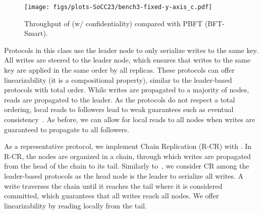 \begin{figure}[t]
\centering

    \texttt{[image: figs/plots-SoCC23/bench3-fixed-y-axis\_c.pdf]}
       
       \caption{Throughput of \projecttitle{} (w/ confidentiality) compared with PBFT (BFT-Smart).}
    \label{fig:confidentiality}
\end{figure}
Protocols in this class use the leader node to only serialize
writes to the same key. All writes are steered to
the leader node, which ensures that writes to the
same key are applied in the same order by all replicas. %
These protocols can offer linearizability (it is a compositional property), similar to the leader-based protocols with total order. While writes are propagated to a majority of nodes, reads are propagated to the leader. As the protocols do not respect a total ordering, local reads to followers lead to weak guarantees such as eventual consistency~\cite{10.1145/1435417.1435432}. As before, we can allow for local reads to all nodes when writes are guaranteed to propagate to all followers. 

 As a representative protocol, we implement Chain Replication (R-CR) with \projecttitle{}. In R-CR, the nodes are organized in a chain, through which writes are propagated from the head of the chain to its tail. Similarly to~\cite{f04eb9b864204bab958e72055062748c}, we consider CR among the leader-based protocols as the head node is the leader to serialize all writes.  A write traverses the chain until it reaches the tail where it is considered committed, which guarantees that all writes reach all nodes.  We offer linearizability by reading locally from the tail.  %


